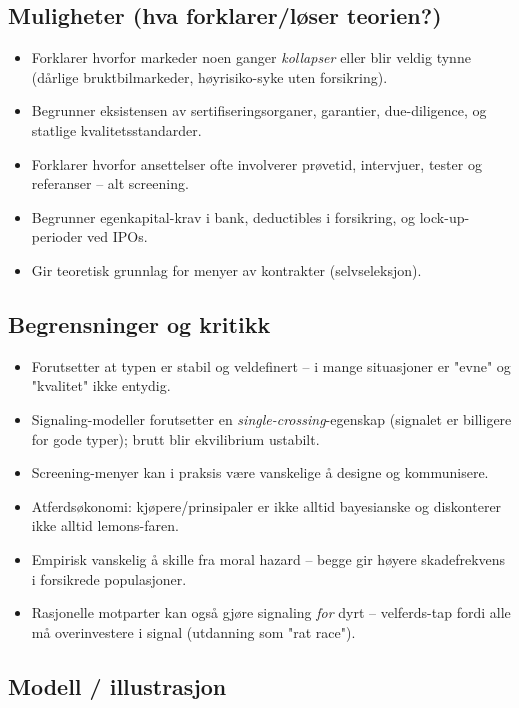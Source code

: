 \subsection*{Muligheter (hva forklarer/løser teorien?)}
\begin{itemize}
\item Forklarer hvorfor markeder noen ganger \emph{kollapser} eller blir veldig tynne (dårlige bruktbilmarkeder, høyrisiko-syke uten forsikring).
\item Begrunner eksistensen av sertifiseringsorganer, garantier, due-diligence, og statlige kvalitetsstandarder.
\item Forklarer hvorfor ansettelser ofte involverer prøvetid, intervjuer, tester og referanser -- alt screening.
\item Begrunner egenkapital-krav i bank, deductibles i forsikring, og lock-up-perioder ved IPOs.
\item Gir teoretisk grunnlag for menyer av kontrakter (selvseleksjon).
\end{itemize}

\subsection*{Begrensninger og kritikk}
\begin{itemize}
\item Forutsetter at typen er stabil og veldefinert -- i mange situasjoner er "evne" og "kvalitet" ikke entydig.
\item Signaling-modeller forutsetter en \emph{single-crossing}-egenskap (signalet er billigere for gode typer); brutt blir ekvilibrium ustabilt.
\item Screening-menyer kan i praksis være vanskelige å designe og kommunisere.
\item Atferdsøkonomi: kjøpere/prinsipaler er ikke alltid bayesianske og diskonterer ikke alltid lemons-faren.
\item Empirisk vanskelig å skille fra moral hazard -- begge gir høyere skadefrekvens i forsikrede populasjoner.
\item Rasjonelle motparter kan også gjøre signaling \emph{for} dyrt -- velferds-tap fordi alle må overinvestere i signal (utdanning som "rat race").
\end{itemize}

\subsection*{Modell / illustrasjon}

